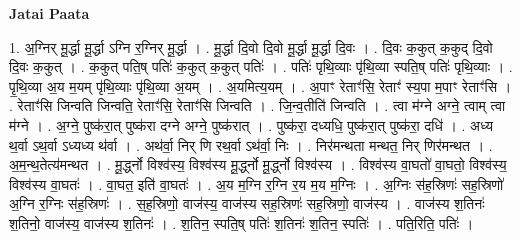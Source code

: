 \documentclass[17pt]{extarticle}
\begin{document}
\textbf{Jatai Paata} \newline

1. अ॒ग्निर् मू॒र्द्धा मू॒र्द्धा ऽग्नि र॒ग्निर् मू॒र्द्धा । . मू॒र्द्धा दि॒वो दि॒वो मू॒र्द्धा मू॒र्द्धा दि॒वः । . दि॒वः क॒कुत् क॒कुद् दि॒वो दि॒वः क॒कुत् । . क॒कुत् पति॒ष् पतिः॑ क॒कुत् क॒कुत् पतिः॑ । . पतिः॑ पृथि॒व्याः पृ॑थि॒व्या स्पति॒ष् पतिः॑ पृथि॒व्याः । . पृ॒थि॒व्या अ॒य म॒यम् पृ॑थि॒व्याः पृ॑थि॒व्या अ॒यम् । . अ॒यमित्य॒यम् । . अ॒पाꣳ रेताꣳ॑सि॒ रेताꣳ॑ स्य॒पा म॒पाꣳ रेताꣳ॑सि । . रेताꣳ॑सि जिन्वति जिन्वति॒ रेताꣳ॑सि॒ रेताꣳ॑सि जिन्वति । . जि॒न्व॒तीति॑ जिन्वति । . त्वा म॑ग्ने अग्ने॒ त्वाम् त्वा म॑ग्ने । . अ॒ग्ने॒ पुष्क॑रा॒त् पुष्क॑रा दग्ने अग्ने॒ पुष्क॑रात् । . पुष्क॑रा॒ दध्यधि॒ पुष्क॑रा॒त् पुष्क॑रा॒ दधि॑ । . अध्य थ॒र्वा ऽथ॒र्वा ऽध्यध्य थ॑र्वा । . अथ॑र्वा॒ निर् णि रथ॒र्वा ऽथ॑र्वा॒ निः । . निर॑मन्थता मन्थत॒ निर् णिर॑मन्थत । . अ॒म॒न्थ॒तेत्य॑मन्थत । . मू॒र्द्ध्नो विश्व॑स्य॒ विश्व॑स्य मू॒र्द्ध्नो मू॒र्द्ध्नो विश्व॑स्य । . विश्व॑स्य वा॒घतो॑ वा॒घतो॒ विश्व॑स्य॒ विश्व॑स्य वा॒घतः॑ । . वा॒घत॒ इति॑ वा॒घतः॑ । . अ॒य म॒ग्नि र॒ग्नि र॒य म॒य म॒ग्निः । . अ॒ग्निः स॑ह॒स्रिणः॑ सह॒स्रिणो॑ अ॒ग्नि र॒ग्निः स॑ह॒स्रिणः॑ । . स॒ह॒स्रिणो॒ वाज॑स्य॒ वाज॑स्य सह॒स्रिणः॑ सह॒स्रिणो॒ वाज॑स्य । . वाज॑स्य श॒तिनः॑ श॒तिनो॒ वाज॑स्य॒ वाज॑स्य श॒तिनः॑ । . श॒तिन॒ स्पति॒ष् पतिः॑ श॒तिनः॑ श॒तिन॒ स्पतिः॑ । . पति॒रिति॒ पतिः॑ । \newline
\end{document}
